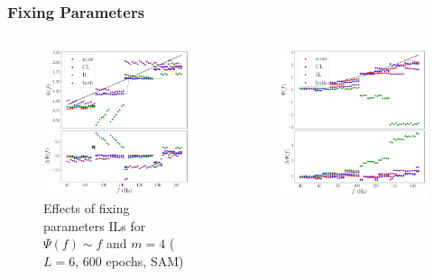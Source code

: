 \documentclass{beamer}
\begin{document}
\begin{frame}
\frametitle{Fixing Parameters}
\begin{columns}
\begin{column}{0.5\textwidth}
\begin{figure}
\centering 
\includegraphics[width=\textwidth]{im/phase_RP_comp_linear_m4}
\caption{Effects of fixing parameters ILs for $\Psi(f) \sim f$ and $m=4$ ($L=6$, 600 epochs, SAM)}
\end{figure}
\end{column}
\begin{column}{0.5\textwidth}
\begin{figure}
\centering 
\includegraphics[width=\textwidth]{im/phase_RP_comp_quadratic_m4}

\end{figure}
\end{column}
\end{columns}
\end{frame}
\end{document}
